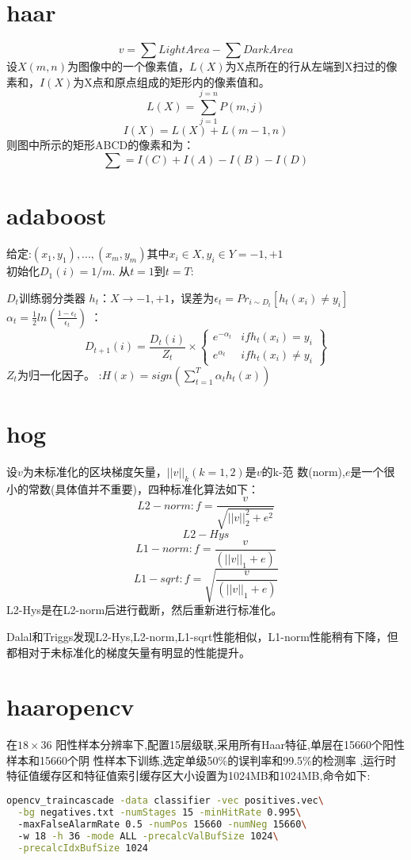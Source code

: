 \documentclass[10pt,technote]{article}
\begin{document}
\section{haar}
\[v=\sum{LightArea}-\sum{DarkArea}\]
设$X(m,n)$为图像中的一个像素值，$L(X)$为X点所在的行从左端到X扫过的像素和，$I(X)$为X点和原点组成的矩形内的像素值和。
\[L(X)=\sum_{j=1}^{j=n}P(m,j)\]
\[I(X)=L(X)+L(m-1,n)\]
则图中所示的矩形ABCD的像素和为：
\[\sum=I(C)+I(A)-I(B)-I(D)\]

\section{adaboost}
给定:$(x_1,y_1),...,(x_m,y_m)$其中$x_i\in{}X,y_i\in{}Y={-1,+1}$
\\初始化$D_1(i)=1/m.$
从$t=1$到$t=T$:
\begin{enumerate}
		$D_t$训练弱分类器
		$h_t：X\to{-1,+1}$，误差为$\epsilon_t=Pr_{i\sim{}D_t}[h_t(x_i)\neq{}y_i]$
		$\alpha_t=\frac{1}{2}ln\left(\frac{1-\epsilon_t}{\epsilon_t}\right)$
		：
				\begin{displaymath}
						D_{t+1}(i)=\frac{D_t(i)}{Z_t}\times\left\{\begin{array}{ll}
										e^{-\alpha_t}&if h_t(x_i)=y_i\\
										 e^{\alpha_t}&if h_t(x_i)\neq{}y_i
						\end{array}\right\}
				\end{displaymath}
				$Z_t$为归一化因子。
		:$H(x)=sign\left(\sum^T_{t=1}\alpha_th_t(x)\right)$
\end{enumerate}
\newpage
\section{hog}
设$v$为未标准化的区块梯度矢量，$||v||_k(k=1,2)$是$v$的k-范
数(norm),$e$是一个很小的常数(具体值并不重要)，四种标准化算法如下：
\[L2-norm:f=\frac{v}{\sqrt{||v||^2_2+e^2}}\]
\[L2-Hys\]
\[L1-norm:f=\frac{v}{(||v||_1+e)}\]
\[L1-sqrt:f=\sqrt{\frac{v}{(||v||_1+e)}}\]
L2-Hys是在L2-norm后进行截断，然后重新进行标准化。

Dalal和Triggs发现L2-Hys,L2-norm,L1-sqrt性能相似，L1-norm性能稍有下降，但
都相对于未标准化的梯度矢量有明显的性能提升。
\section{haaropencv}
在$18\times36$
阳性样本分辨率下,配置15层级联,采用所有Haar特征,单层在15660个阳性样本和15660个阴
性样本下训练,选定单级50\%的误判率和99.5\%的检测率
,运行时特征值缓存区和特征值索引缓存区大小设置为1024MB和1024MB,命令如下:
\begin{lstlisting}[language=bash]
opencv_traincascade -data classifier -vec positives.vec\
  -bg negatives.txt -numStages 15 -minHitRate 0.995\ 
  -maxFalseAlarmRate 0.5 -numPos 15660 -numNeg 15660\ 
  -w 18 -h 36 -mode ALL -precalcValBufSize 1024\
  -precalcIdxBufSize 1024
\end{lstlisting}
\end{document}
